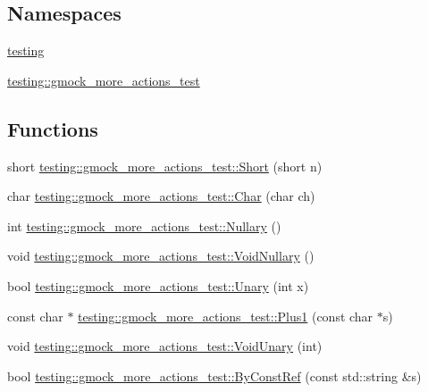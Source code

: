 \subsection*{Namespaces}
\begin{DoxyCompactItemize}
\item 
 \mbox{\hyperlink{namespacetesting}{testing}}
\item 
 \mbox{\hyperlink{namespacetesting_1_1gmock__more__actions__test}{testing\+::gmock\+\_\+more\+\_\+actions\+\_\+test}}
\end{DoxyCompactItemize}
\subsection*{Functions}
\begin{DoxyCompactItemize}
\item 
short \mbox{\hyperlink{namespacetesting_1_1gmock__more__actions__test_a00503d3168f1123e314c0d42b7e10b88}{testing\+::gmock\+\_\+more\+\_\+actions\+\_\+test\+::\+Short}} (short n)
\item 
char \mbox{\hyperlink{namespacetesting_1_1gmock__more__actions__test_af69e6906d734a99d60480e4291891d66}{testing\+::gmock\+\_\+more\+\_\+actions\+\_\+test\+::\+Char}} (char ch)
\item 
int \mbox{\hyperlink{namespacetesting_1_1gmock__more__actions__test_acdd2dd80f777fdb770b513b63064ac19}{testing\+::gmock\+\_\+more\+\_\+actions\+\_\+test\+::\+Nullary}} ()
\item 
void \mbox{\hyperlink{namespacetesting_1_1gmock__more__actions__test_a061f6d66383a4e793b4d4ca93bd8ca2f}{testing\+::gmock\+\_\+more\+\_\+actions\+\_\+test\+::\+Void\+Nullary}} ()
\item 
bool \mbox{\hyperlink{namespacetesting_1_1gmock__more__actions__test_aad456ea2ee1b0cb2741b676a34f540a3}{testing\+::gmock\+\_\+more\+\_\+actions\+\_\+test\+::\+Unary}} (int x)
\item 
const char $\ast$ \mbox{\hyperlink{namespacetesting_1_1gmock__more__actions__test_a986ada18d3311d3fa3a7c33e54e18f33}{testing\+::gmock\+\_\+more\+\_\+actions\+\_\+test\+::\+Plus1}} (const char $\ast$s)
\item 
void \mbox{\hyperlink{namespacetesting_1_1gmock__more__actions__test_a163632ef644604032f00334fce36de1a}{testing\+::gmock\+\_\+more\+\_\+actions\+\_\+test\+::\+Void\+Unary}} (int)
\item 
bool \mbox{\hyperlink{namespacetesting_1_1gmock__more__actions__test_a38903b39cda75bfa5c932f4abec7a0ca}{testing\+::gmock\+\_\+more\+\_\+actions\+\_\+test\+::\+By\+Const\+Ref}} (const std\+::string \&s)

\end{DoxyCompactItemize}
